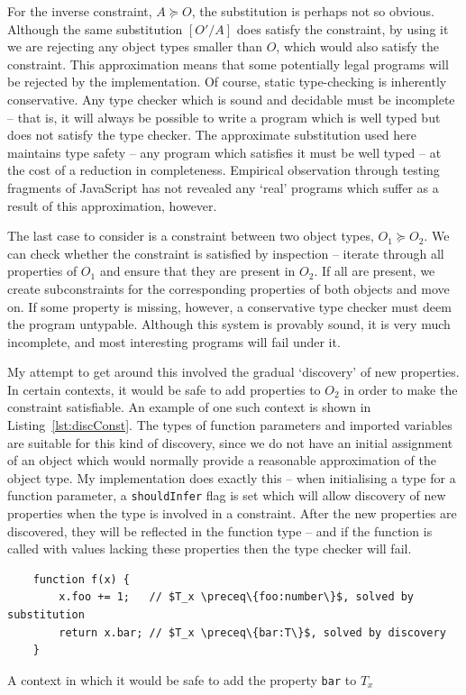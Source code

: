 \documentclass[12pt,a4paper,twoside,openright]{report}
\theoremstyle{definition}
\theoremstyle{dotless}
\newcommand*{\js}{\texttt}
\begin{document}
For the inverse constraint, $A\succeq O$, the substitution is perhaps not so
obvious. Although the same substitution $[O'/A]$ does satisfy the constraint,
by using it we are rejecting any object types smaller than $O$, which would
also satisfy the constraint. This approximation means that some potentially
legal programs will be rejected by the implementation. Of course, static
type-checking is inherently conservative.  Any type checker which is sound and
decidable must be incomplete -- that is, it will always be possible to write a
program which is well typed but does not satisfy the type checker. The
approximate substitution used here maintains type safety -- any program which
satisfies it must be well typed -- at the cost of a reduction in
completeness. Empirical observation through testing fragments of JavaScript has
not revealed any `real' programs which suffer as a result of this
approximation, however.

The last case to consider is a constraint between two object types, $O_1\succeq
O_2$. We can check whether the constraint is satisfied by inspection -- iterate
through all properties of $O_1$ and ensure that they are present in $O_2$. If
all are present, we create subconstraints for the corresponding properties of
both objects and move on.  If some property is missing, however, a conservative
type checker must deem the program untypable. Although this system is provably
sound, it is very much incomplete, and most interesting programs will fail under it.

My attempt to get around this involved the gradual `discovery' of new properties.
In certain contexts, it would be safe to add properties to $O_2$ in order to make the
constraint satisfiable. An example of one such context is shown in Listing~\ref{lst:discConst}.
The types of function parameters and imported variables are suitable for this kind of discovery, since 
we do not have an initial assignment of an object which would normally provide a reasonable
approximation of the object type. My implementation does exactly this -- when initialising a type
for a function parameter, a \js{shouldInfer} flag is set which will allow discovery 
of new properties when the type is involved in a constraint. After the new properties are 
discovered, they will be reflected in the function type -- and if the function is called with 
values lacking these properties then the type checker will fail.

\begin{program}
  \begin{verbatim}
	function f(x) {
		x.foo += 1;   // $T_x \preceq\{foo:number\}$, solved by substitution
		return x.bar; // $T_x \preceq\{bar:T\}$, solved by discovery
	}
  \end{verbatim}
  \caption{A context in which it would be safe to add the property \js{bar} to $T_x$}
  \label{lst:discConst}
\end{program}
\end{document}
